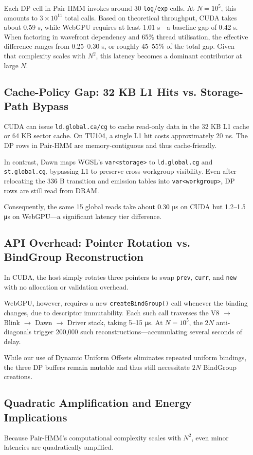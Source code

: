 \documentclass[PhD]{PHlab-thesis}
\begin{document}
Each DP cell in Pair-HMM invokes around 30 \texttt{log}/\texttt{exp} calls. At $N=10^5$, this amounts to $3 \times 10^{11}$ total calls. Based on theoretical throughput, CUDA takes about 0.59 s, while WebGPU requires at least 1.01 s—a baseline gap of 0.42 s. When factoring in wavefront dependency and 65\% thread utilisation, the effective difference ranges from 0.25–0.30 s, or roughly 45–55\% of the total gap. Given that complexity scales with $N^2$, this latency becomes a dominant contributor at large $N$.

\subsection{Cache-Policy Gap: 32 KB L1 Hits vs. Storage-Path Bypass}
CUDA can issue \texttt{ld.global.ca/cg} to cache read-only data in the 32 KB L1 cache or 64 KB sector cache. On TU104, a single L1 hit costs approximately 20 ns. The DP rows in Pair-HMM are memory-contiguous and thus cache-friendly.

In contrast, Dawn maps WGSL's \texttt{var<storage>} to \texttt{ld.global.cg} and \texttt{st.global.cg}, bypassing L1 to preserve cross-workgroup visibility. Even after relocating the 336 B transition and emission tables into \texttt{var<workgroup>}, DP rows are still read from DRAM.

Consequently, the same 15 global reads take about 0.30 μs on CUDA but 1.2–1.5 μs on WebGPU—a significant latency tier difference.

\subsection{API Overhead: Pointer Rotation vs. BindGroup Reconstruction}
In CUDA, the host simply rotates three pointers to swap \texttt{prev}, \texttt{curr}, and \texttt{new} with no allocation or validation overhead.

WebGPU, however, requires a new \texttt{createBindGroup()} call whenever the binding changes, due to descriptor immutability. Each such call traverses the V8 $\rightarrow$ Blink $\rightarrow$ Dawn $\rightarrow$ Driver stack, taking 5–15 μs. At $N = 10^5$, the $2N$ anti-diagonals trigger 200,000 such reconstructions—accumulating several seconds of delay.

While our use of Dynamic Uniform Offsets eliminates repeated uniform bindings, the three DP buffers remain mutable and thus still necessitate $2N$ BindGroup creations.

\subsection{Quadratic Amplification and Energy Implications}
Because Pair-HMM's computational complexity scales with $N^2$, even minor latencies are quadratically amplified.
\end{document}
